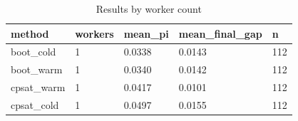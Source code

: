 \begin{table}[t]
\centering
\begin{tabular}{lllll}
\toprule
method & workers & mean\_pi & mean\_final\_gap & n \\
\midrule
boot\_cold & 1 & 0.0338 & 0.0143 & 112 \\
boot\_warm & 1 & 0.0340 & 0.0142 & 112 \\
cpsat\_warm & 1 & 0.0417 & 0.0101 & 112 \\
cpsat\_cold & 1 & 0.0497 & 0.0155 & 112 \\
\bottomrule
\end{tabular}
\caption{Results by worker count}
\label{tab:by-workers}
\end{table}
